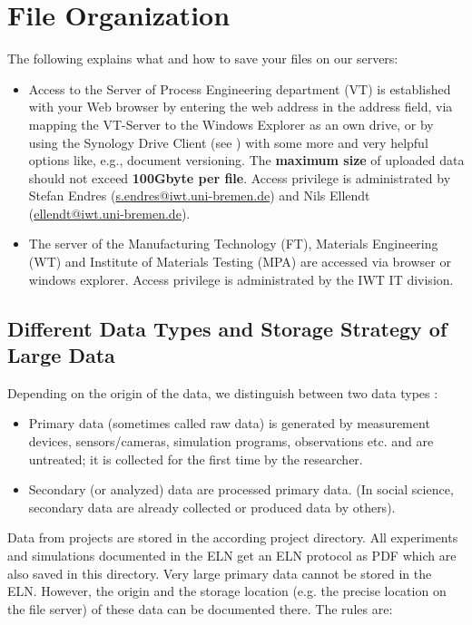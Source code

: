 \section{File Organization}
The following explains what and how to save your files on our servers:
\begin{itemize}
  \item Access to the Server of Process Engineering department (VT) is established with your Web browser by entering the web address in the address field, via mapping the VT-Server to the Windows Explorer as an own drive, or by using the Synology Drive Client (see \cite{synology2022}) with some more and very helpful options like, e.g., document versioning. The \textbf{maximum size} of uploaded data should not exceed \textbf{100Gbyte per file}. Access privilege is administrated by Stefan Endres (\href{mailto:s.endres@iwt.uni-bremen.de}{s.endres@iwt.uni-bremen.de}) and Nils Ellendt (\href{mailto:ellendt@iwt.uni-bremen.de}{ellendt@iwt.uni-bremen.de}).
  \item The server of the Manufacturing Technology (FT), Materials Engineering (WT) and Institute of Materials Testing (MPA) are accessed via browser or windows explorer. Access privilege is administrated by the IWT IT division.
\end{itemize}

\subsection{Different Data Types and Storage Strategy of Large Data}
Depending on the origin of the data, we distinguish between two data types \cite{gitelman2013}:
\begin{itemize}
  \item Primary data (sometimes called raw data) is generated by measurement
        devices, sensors/cameras, simulation programs, observations etc. and
        are untreated; it is collected for the first time by the researcher.
  \item Secondary (or analyzed) data are processed primary data. (In social
        science, secondary data are already collected or produced data by
        others).
\end{itemize}
Data from projects are stored in the according project directory. All experiments and simulations documented in the ELN get an ELN protocol as PDF which are also saved in this directory. Very large primary data cannot be stored in the ELN. However, the origin and the storage location (e.g. the precise location on the file server) of these data can be documented there. The rules are:






